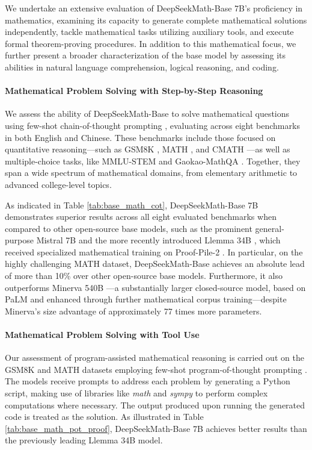 \begin{itemize}[topsep=0pt]
We undertake an extensive evaluation of DeepSeekMath-Base 7B’s proficiency in mathematics, examining its capacity to generate complete mathematical solutions independently, tackle mathematical tasks utilizing auxiliary tools, and execute formal theorem-proving procedures. In addition to this mathematical focus, we further present a broader characterization of the base model by assessing its abilities in natural language comprehension, logical reasoning, and coding.

\paragraph{Mathematical Problem Solving with Step-by-Step Reasoning}

We assess the ability of DeepSeekMath-Base to solve mathematical questions using few-shot chain-of-thought prompting \citep{cot}, evaluating across eight benchmarks in both English and Chinese. These benchmarks include those focused on quantitative reasoning—such as GSM8K \citep{gsm8k}, MATH \citep{MATH}, and CMATH \citep{wei2023cmath}—as well as multiple-choice tasks, like MMLU-STEM \citep{mmlu} and Gaokao-MathQA \citep{agieval}. Together, they span a wide spectrum of mathematical domains, from elementary arithmetic to advanced college-level topics.

As indicated in Table \ref{tab:base_math_cot}, DeepSeekMath-Base 7B demonstrates superior results across all eight evaluated benchmarks when compared to other open-source base models, such as the prominent general-purpose Mistral 7B \citep{mistral} and the more recently introduced Llemma 34B \citep{llemma}, which received specialized mathematical training on Proof-Pile-2 \citep{llemma}. In particular, on the highly challenging MATH dataset, DeepSeekMath-Base achieves an absolute lead of more than 10\% over other open-source base models. Furthermore, it also outperforms Minerva 540B \citep{minerva}—a substantially larger closed-source model, based on PaLM \citep{palm} and enhanced through further mathematical corpus training—despite Minerva’s size advantage of approximately 77 times more parameters.

\paragraph{Mathematical Problem Solving with Tool Use} Our assessment of program-assisted mathematical reasoning is carried out on the GSM8K and MATH datasets employing few-shot program-of-thought prompting \citep{pot,pal}. The models receive prompts to address each problem by generating a Python script, making use of libraries like \textit{math} and \textit{sympy} to perform complex computations where necessary. The output produced upon running the generated code is treated as the solution. As illustrated in Table \ref{tab:base_math_pot_proof}, DeepSeekMath-Base 7B achieves better results than the previously leading Llemma 34B model.


\end{itemize}
